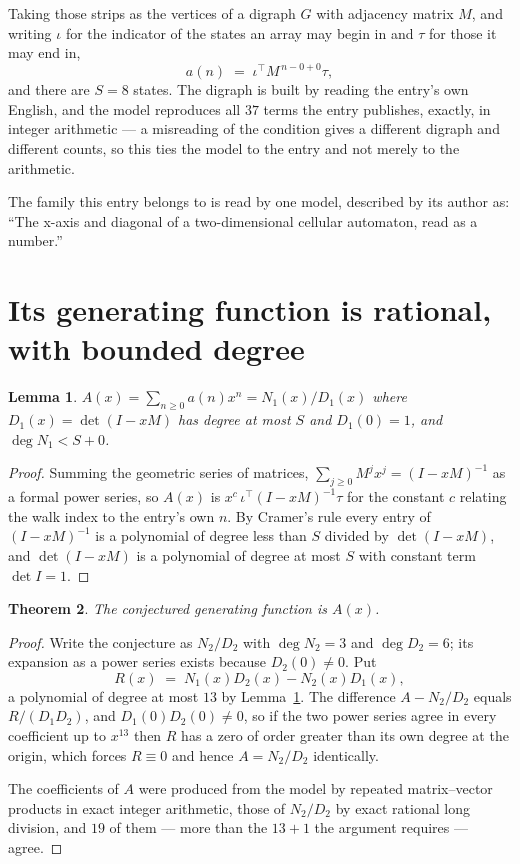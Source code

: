 \documentclass[11pt,a4paper]{article}
\theoremstyle{plain}
\newtheorem{theorem}{Theorem}
\newtheorem{lemma}[theorem]{Lemma}
\theoremstyle{definition}
\begin{document}
Taking those strips as the vertices of a digraph $G$ with adjacency matrix $M$, and writing
$\iota$ for the indicator of the states an array may begin in and $\tau$ for those it may end
in,
\[
a(n)\;=\;\iota^{\!\top}M^{\,n-0+0}\tau ,
\]
and there are $S=8$ states. The digraph is built by reading the entry's own English, and the
model reproduces all $37$ terms the entry publishes, exactly, in integer arithmetic --- a
misreading of the condition gives a different digraph and different counts, so this ties the
model to the entry and not merely to the arithmetic.

The family this entry belongs to is read by one model, described by its author as: ``The x-axis and diagonal of a two-dimensional cellular automaton, read as a number.''


\section{Its generating function is rational, with bounded degree}

\begin{lemma}\label{lem:rat}
$A(x)=\sum_{n\ge0}a(n)x^n=N_1(x)/D_1(x)$ where $D_1(x)=\det(I-xM)$ has degree at most
$S$ and $D_1(0)=1$, and $\deg N_1<S+0$.
\end{lemma}

\begin{proof}
Summing the geometric series of matrices, $\sum_{j\ge0}M^jx^j=(I-xM)^{-1}$ as a formal
power series, so $A(x)$ is $x^{c}\,\iota^{\!\top}(I-xM)^{-1}\tau$ for the constant $c$
relating the walk index to the entry's own $n$. By Cramer's rule every entry of
$(I-xM)^{-1}$ is a polynomial of degree less than $S$ divided by $\det(I-xM)$, and
$\det(I-xM)$ is a polynomial of degree at most $S$ with constant term $\det I=1$.
\end{proof}

\begin{theorem}
The conjectured generating function is $A(x)$.
\end{theorem}

\begin{proof}
Write the conjecture as $N_2/D_2$ with $\deg N_2=3$ and $\deg D_2=6$; its expansion as a
power series exists because $D_2(0)\neq0$. Put
\[
R(x)\;=\;N_1(x)D_2(x)-N_2(x)D_1(x),
\]
a polynomial of degree at most $13$ by Lemma~\ref{lem:rat}. The difference
$A-N_2/D_2$ equals $R/(D_1D_2)$, and $D_1(0)D_2(0)\neq0$, so if the two power series agree in
every coefficient up to $x^{13}$ then $R$ has a zero of order greater than its own
degree at the origin, which forces $R\equiv0$ and hence $A=N_2/D_2$ identically.

The coefficients of $A$ were produced from the model by repeated matrix--vector products in
exact integer arithmetic, those of $N_2/D_2$ by exact rational long division, and $19$
of them --- more than the $13+1$ the argument requires --- agree.
\end{proof}
\end{document}
